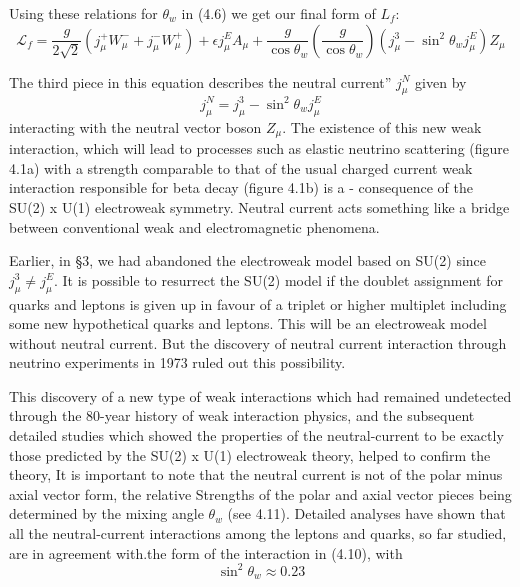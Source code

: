 Using these relations for $\theta_{w}$ in (4.6) we get our final form of $L_{f}$:
\begin{equation*}
\mathcal{L}_{f}= \frac{g}{2\sqrt{2}} (j^{+}_{\mu} W^{-}_{\mu} + j^{-}_{\mu}W^{+}_{\mu}) + \epsilon j^{E}_{\mu} A_{\mu} + \frac{g}{\cos \theta_{w}} (\frac{g}{\cos \theta_{w}})(j^{3}_{\mu} - \sin^{2} \theta_{w}j^{E}_{\mu})Z_{\mu}\tag{4.10}
\end{equation*}

The third piece in this equation describes the neutral current” $j^{N}_{\mu}$ given by
\begin{equation*}
j^{N}_{\mu}= j^{3}_{\mu}- \sin^{2}\theta_{w}j^{E}_{\mu}\tag{4.11}
\end{equation*}
interacting with the neutral vector boson $Z_{\mu}$. The existence of this new weak interaction, which will lead to processes such as elastic neutrino scattering (figure 4.1a) with a strength comparable to that of the usual charged current weak interaction responsible for beta decay (figure 4.1b) is a - consequence of the SU(2) x U(1) electroweak symmetry. Neutral current acts something like a bridge between conventional weak and electromagnetic phenomena. 

Earlier, in §3, we had abandoned the electroweak model based on SU(2) since $j^{3}_{\mu} \neq j^{E}_{\mu}$. It is possible to resurrect the SU(2) model if the doublet assignment for quarks and leptons is given up in favour of a triplet or higher multiplet including some new hypothetical quarks and leptons. This will be an electroweak model without neutral current. But the discovery of neutral current interaction through neutrino experiments in 1973 ruled out this possibility. 

This discovery of a new type of weak interactions which had remained undetected through the 80-year history of weak interaction physics, and the subsequent detailed studies which showed the properties of the neutral-current to be exactly those predicted by the SU(2) x U(1) electroweak theory, helped to confirm the theory, It is important to note that the neutral current is not of the polar minus axial vector form, the relative Strengths of the polar and axial vector pieces being determined by the mixing angle $\theta_{w}$ (see 4.11). Detailed analyses have shown that all the neutral-current interactions among the leptons and quarks, so far studied, are in agreement with.the form of the interaction in (4.10), with 
\begin{equation*}
\sin^{2}\theta_{w}\approx 0.23\tag{4.12}
\end{equation*}	

